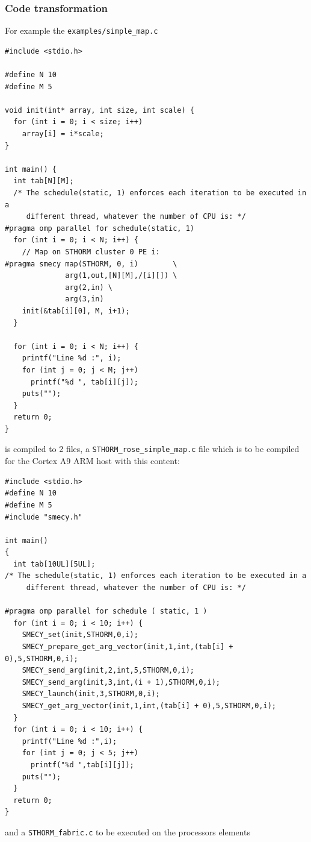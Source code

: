 \documentclass[a4paper]{article}
\begin{document}
\subsubsection{Code transformation}
\label{sec:code-transformation}

For example the \verb|examples/simple_map.c|
\begin{lstlisting}
#include <stdio.h>

#define N 10
#define M 5

void init(int* array, int size, int scale) {
  for (int i = 0; i < size; i++)
    array[i] = i*scale;
}

int main() {
  int tab[N][M];
  /* The schedule(static, 1) enforces each iteration to be executed in a
     different thread, whatever the number of CPU is: */
#pragma omp parallel for schedule(static, 1)
  for (int i = 0; i < N; i++) {
    // Map on STHORM cluster 0 PE i:
#pragma smecy map(STHORM, 0, i)        \
              arg(1,out,[N][M],/[i][]) \
              arg(2,in) \
              arg(3,in)
    init(&tab[i][0], M, i+1);
  }

  for (int i = 0; i < N; i++) {
    printf("Line %d :", i);
    for (int j = 0; j < M; j++)
      printf("%d ", tab[i][j]);
    puts("");
  }
  return 0;
}
\end{lstlisting}
is compiled to 2 files, a \verb|STHORM_rose_simple_map.c| file which is
to be compiled for the Cortex A9 ARM host with this content:
\begin{lstlisting}
#include <stdio.h>
#define N 10
#define M 5
#include "smecy.h" 

int main()
{
  int tab[10UL][5UL];
/* The schedule(static, 1) enforces each iteration to be executed in a
     different thread, whatever the number of CPU is: */
  
#pragma omp parallel for schedule ( static, 1 )
  for (int i = 0; i < 10; i++) {
    SMECY_set(init,STHORM,0,i);
    SMECY_prepare_get_arg_vector(init,1,int,(tab[i] + 0),5,STHORM,0,i);
    SMECY_send_arg(init,2,int,5,STHORM,0,i);
    SMECY_send_arg(init,3,int,(i + 1),STHORM,0,i);
    SMECY_launch(init,3,STHORM,0,i);
    SMECY_get_arg_vector(init,1,int,(tab[i] + 0),5,STHORM,0,i);
  }
  for (int i = 0; i < 10; i++) {
    printf("Line %d :",i);
    for (int j = 0; j < 5; j++) 
      printf("%d ",tab[i][j]);
    puts("");
  }
  return 0;
}
\end{lstlisting}
and a \verb|STHORM_fabric.c| to be executed on the processors elements
\end{document}
